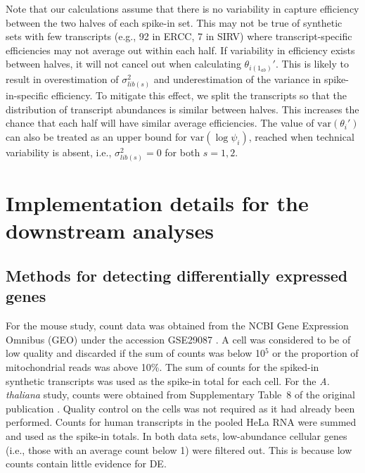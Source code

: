 \documentclass{article}
\begin{document}
Note that our calculations assume that there is no variability in capture efficiency between the two halves of each spike-in set.
This may not be true of synthetic sets with few transcripts (e.g., 92 in ERCC, 7 in SIRV) where transcript-specific efficiencies may not average out within each half.
If variability in efficiency exists between halves, it will not cancel out when calculating $\theta_{i(1_{ab})}'$.
This is likely to result in overestimation of $\sigma^2_{lib(s)}$ and underestimation of the variance in spike-in-specific efficiency.
To mitigate this effect, we split the transcripts so that the distribution of transcript abundances is similar between halves.
This increases the chance that each half will have similar average efficiencies.
The value of $\mbox{var}(\theta_i')$ can also be treated as an upper bound for $\mbox{var}(\log \psi_i)$, reached when technical variability is absent, i.e., $\sigma^2_{lib(s)}=0$ for both $s=1,2$.


\section{Implementation details for the downstream analyses}

\subsection{Methods for detecting differentially expressed genes}
For the mouse study, count data was obtained from the NCBI Gene Expression Omnibus (GEO) under the accession GSE29087 \cite{islam2011characterization}.
A cell was considered to be of low quality and discarded if the sum of counts was below 10$^5$ or the proportion of mitochondrial reads was above 10\%.
The sum of counts for the spiked-in synthetic transcripts was used as the spike-in total for each cell.
For the \textit{A. thaliana} study, counts were obtained from Supplementary Table~8 of the original publication \cite{brennecke2013accounting}.
Quality control on the cells was not required as it had already been performed.
Counts for human transcripts in the pooled HeLa RNA were summed and used as the spike-in totals.
In both data sets, low-abundance cellular genes (i.e., those with an average count below 1) were filtered out.
This is because low counts contain little evidence for DE. 
\end{document}
